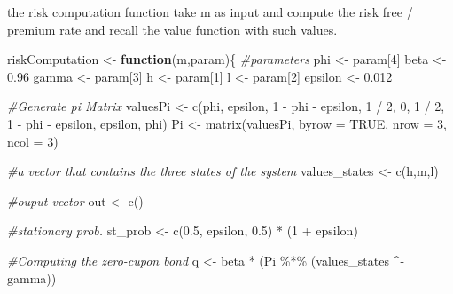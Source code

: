 \documentclass[
]{article}
\newenvironment{Shaded}{\begin{snugshade}}{\end{snugshade}}
\newcommand{\AttributeTok}[1]{\textcolor[rgb]{0.77,0.63,0.00}{#1}}
\newcommand{\CommentTok}[1]{\textcolor[rgb]{0.56,0.35,0.01}{\textit{#1}}}
\newcommand{\ConstantTok}[1]{\textcolor[rgb]{0.00,0.00,0.00}{#1}}
\newcommand{\ControlFlowTok}[1]{\textcolor[rgb]{0.13,0.29,0.53}{\textbf{#1}}}
\newcommand{\DecValTok}[1]{\textcolor[rgb]{0.00,0.00,0.81}{#1}}
\newcommand{\FloatTok}[1]{\textcolor[rgb]{0.00,0.00,0.81}{#1}}
\newcommand{\FunctionTok}[1]{\textcolor[rgb]{0.00,0.00,0.00}{#1}}
\newcommand{\NormalTok}[1]{#1}
\newcommand{\OtherTok}[1]{\textcolor[rgb]{0.56,0.35,0.01}{#1}}
\newcommand{\SpecialCharTok}[1]{\textcolor[rgb]{0.00,0.00,0.00}{#1}}
\begin{document}
the risk computation function take m as input and compute the risk free
/ premium rate and recall the value function with such values.

\begin{Shaded}
\begin{Highlighting}[]
\NormalTok{riskComputation }\OtherTok{\textless{}{-}} \ControlFlowTok{function}\NormalTok{(m,param)\{}
    \CommentTok{\#parameters }
\NormalTok{    phi     }\OtherTok{\textless{}{-}}\NormalTok{  param[}\DecValTok{4}\NormalTok{]}
\NormalTok{    beta    }\OtherTok{\textless{}{-}} \FloatTok{0.96}
\NormalTok{    gamma   }\OtherTok{\textless{}{-}}\NormalTok{ param[}\DecValTok{3}\NormalTok{]}
\NormalTok{    h       }\OtherTok{\textless{}{-}}\NormalTok{ param[}\DecValTok{1}\NormalTok{]}
\NormalTok{    l       }\OtherTok{\textless{}{-}}\NormalTok{ param[}\DecValTok{2}\NormalTok{]}
\NormalTok{    epsilon }\OtherTok{\textless{}{-}} \FloatTok{0.012}

    \CommentTok{\#Generate pi Matrix}
\NormalTok{    valuesPi        }\OtherTok{\textless{}{-}}   \FunctionTok{c}\NormalTok{(phi, epsilon, }\DecValTok{1} \SpecialCharTok{{-}}\NormalTok{ phi }\SpecialCharTok{{-}}\NormalTok{ epsilon, }\DecValTok{1} \SpecialCharTok{/} \DecValTok{2}\NormalTok{,}
     \DecValTok{0}\NormalTok{, }\DecValTok{1} \SpecialCharTok{/} \DecValTok{2}\NormalTok{, }\DecValTok{1} \SpecialCharTok{{-}}\NormalTok{ phi }\SpecialCharTok{{-}}\NormalTok{ epsilon, epsilon, phi)}
\NormalTok{    Pi              }\OtherTok{\textless{}{-}}   \FunctionTok{matrix}\NormalTok{(valuesPi, }\AttributeTok{byrow =} \ConstantTok{TRUE}\NormalTok{, }\AttributeTok{nrow =} \DecValTok{3}\NormalTok{, }\AttributeTok{ncol =} \DecValTok{3}\NormalTok{)}

    \CommentTok{\#a vector that contains the three states of the system}
\NormalTok{    values\_states   }\OtherTok{\textless{}{-}}   \FunctionTok{c}\NormalTok{(h,m,l)}

    \CommentTok{\#ouput vector}
\NormalTok{    out }\OtherTok{\textless{}{-}}  \FunctionTok{c}\NormalTok{()}

    \CommentTok{\#stationary prob.}
\NormalTok{    st\_prob }\OtherTok{\textless{}{-}} \FunctionTok{c}\NormalTok{(}\FloatTok{0.5}\NormalTok{, epsilon, }\FloatTok{0.5}\NormalTok{) }\SpecialCharTok{*}\NormalTok{ (}\DecValTok{1} \SpecialCharTok{+}\NormalTok{ epsilon)}

    \CommentTok{\#Computing the zero{-}cupon bond }
\NormalTok{    q   }\OtherTok{\textless{}{-}}\NormalTok{  beta }\SpecialCharTok{*}\NormalTok{ (Pi }\SpecialCharTok{\%*\%}\NormalTok{ (values\_states }\SpecialCharTok{\^{}{-}}\NormalTok{ gamma))}


\end{Highlighting}
\end{Shaded}
\end{document}
